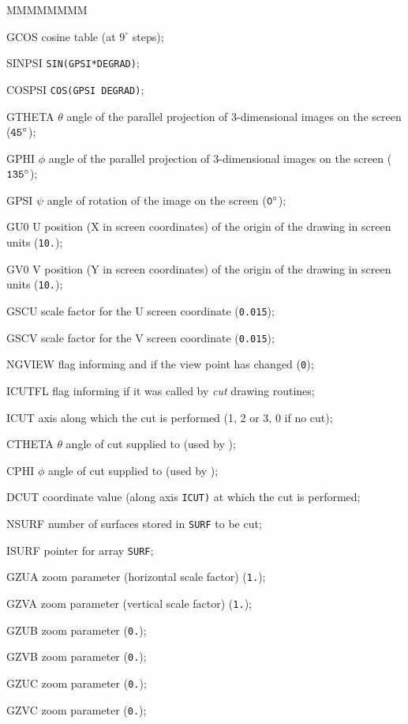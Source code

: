 \begin{DLtt}{MMMMMMMM}
\item[GCOS] cosine table (at $9^{\circ}$ steps);
\item[SINPSI] {\tt SIN(GPSI*DEGRAD)};
\item[COSPSI] {\tt COS(GPSI DEGRAD)};
\item[GTHETA] $\theta$ angle of the parallel projection of 3-dimensional
images on the screen (${\tt 45^{\circ}}$);
\item[GPHI]  $\phi$ angle of the parallel projection of 3-dimensional
images on the screen (${\tt 135^{\circ}}$);
\item[GPSI]  $\psi$ angle of rotation of the image on the screen
(${\tt 0^{\circ}}$);
\item[GU0]  U position (X in screen coordinates) of the origin of the drawing
in screen units ({\tt 10.});
\item[GV0]  V position (Y in screen coordinates) of the origin of the drawing
in screen units ({\tt 10.});
\item[GSCU]   scale factor for the U screen coordinate  ({\tt 0.015});
\item[GSCV]   scale factor for the V screen coordinate ({\tt 0.015});
\item[NGVIEW] flag informing  and  if
the view point has changed  ({\tt 0});
\item[ICUTFL] flag informing  if it was called by
{\it cut} drawing routines;
\item[ICUT] axis along which the cut is performed (1, 2 or 3, 0 if no cut);
\item[CTHETA] $\theta$ angle of cut supplied to  (used by
);
\item[CPHI] $\phi$ angle of cut supplied to  (used by
);
\item[DCUT] coordinate value (along axis {\tt ICUT)} at which the cut is
performed;
\item[NSURF] number of surfaces stored in {\tt SURF} to be cut;
\item[ISURF] pointer for array {\tt SURF};
\item[GZUA] zoom parameter (horizontal scale factor)  ({\tt 1.});
\item[GZVA] zoom parameter (vertical scale factor)  ({\tt 1.});
\item[GZUB] zoom parameter  ({\tt 0.});
\item[GZVB] zoom parameter  ({\tt 0.});
\item[GZUC] zoom parameter  ({\tt 0.});
\item[GZVC] zoom parameter  ({\tt 0.});

\end{DLtt}
